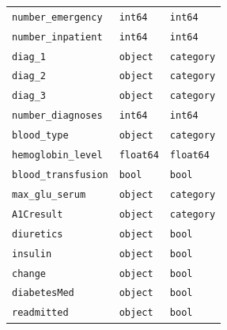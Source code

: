 \documentclass[a4paper,11pt]{article}
\newcommand{\numberEmergency}{\texttt{number\_emergency}\xspace}
\newcommand{\numberInpatient}{\texttt{number\_inpatient}\xspace}
\newcommand{\diagOne}{\texttt{diag\_1}\xspace}
\newcommand{\diagTwo}{\texttt{diag\_2}\xspace}
\newcommand{\diagThree}{\texttt{diag\_3}\xspace}
\newcommand{\numberDiagnoses}{\texttt{number\_diagnoses}\xspace}
\newcommand{\bloodType}{\texttt{blood\_type}\xspace}
\newcommand{\hemoglobinLevel}{\texttt{hemoglobin\_level}\xspace}
\newcommand{\bloodTransfusion}{\texttt{blood\_transfusion}\xspace}
\newcommand{\maxGluSerum}{\texttt{max\_glu\_serum}\xspace}
\newcommand{\AOneCresult}{\texttt{A1Cresult}\xspace}
\newcommand{\diuretics}{\texttt{diuretics}\xspace}
\newcommand{\insulin}{\texttt{insulin}\xspace}
\newcommand{\change}{\texttt{change}\xspace}
\newcommand{\diabetesMed}{\texttt{diabetesMed}\xspace}
\newcommand{\readmitted}{\texttt{readmitted}\xspace}
\begin{document}
\begin{table}[H]
\begin{tabularx}{1\textwidth}{XYY}
\numberEmergency            &    \texttt{int64} &     \texttt{int64} \\
\numberInpatient            &    \texttt{int64} &     \texttt{int64} \\
\diagOne                      &   \texttt{object} &  \texttt{category} \\
\diagTwo                      &   \texttt{object} &  \texttt{category} \\
\diagThree                      &   \texttt{object} &  \texttt{category} \\
\numberDiagnoses            &    \texttt{int64} &     \texttt{int64} \\
\bloodType                  &   \texttt{object} &  \texttt{category} \\
\hemoglobinLevel            &  \texttt{float64} &   \texttt{float64} \\
\bloodTransfusion           &     \texttt{bool} &      \texttt{bool} \\
\maxGluSerum               &   \texttt{object} &  \texttt{category} \\
\AOneCresult                   &   \texttt{object} &  \texttt{category} \\
\diuretics                   &   \texttt{object} &      \texttt{bool} \\
\insulin                     &   \texttt{object} &      \texttt{bool} \\
\change                      &   \texttt{object} &      \texttt{bool} \\
\diabetesMed                 &   \texttt{object} &      \texttt{bool} \\
\readmitted                  &   \texttt{object} &      \texttt{bool} \\
\bottomrule
\end{tabularx}
\end{table}
\end{document}
